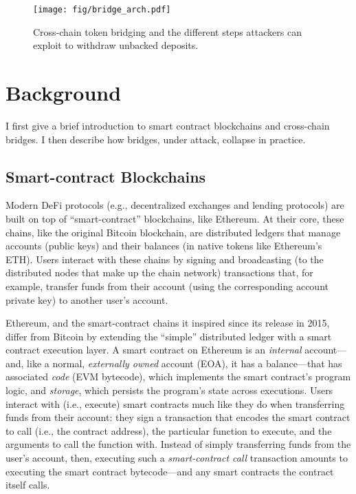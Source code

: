 \begin{figure}[h]
\centering
\texttt{[image: fig/bridge\_arch.pdf]}
\caption[Cross-chain Token Bridging]{Cross-chain token bridging and the different steps attackers can exploit to withdraw unbacked deposits.}
\label{fig:cross-chain}
\end{figure}

\section{Background}
\label{sec:background}
I first give a brief introduction to smart contract blockchains
and cross-chain bridges. I then describe how bridges, under attack, collapse in
practice.

\subsection{Smart-contract Blockchains} Modern DeFi protocols (e.g.,
decentralized exchanges and lending protocols) are built on top
of ``smart-contract'' blockchains, like Ethereum. At their core, these chains, like
the original Bitcoin blockchain, are distributed ledgers that manage accounts
(public keys) and their balances (in native tokens like Ethereum's ETH). Users
interact with these chains by signing and broadcasting (to the distributed nodes
that make up the chain network) transactions that, for example, transfer
funds from their account (using the corresponding account private key) to
another user's account.

Ethereum, and the smart-contract chains it inspired since its release in 2015,
differ from Bitcoin by extending the ``simple'' distributed ledger with a smart
contract execution layer. A smart contract on Ethereum is an \emph{internal}
account---and, like a normal, \emph{externally owned} account (EOA), it has a
balance---that has associated \emph{code} (EVM bytecode), which implements the
smart contract's program logic, and \emph{storage}, which persists the program's
state across executions. Users interact with (i.e., execute) smart contracts
much like they do when transferring funds from their account: they sign a
transaction that encodes the smart contract to call (i.e., the contract address),
the particular function to execute, and the arguments to call the function with.
Instead of simply transferring funds from the user's account, then, executing
such a \emph{smart-contract call} transaction amounts to executing the smart
contract bytecode---and any smart contracts the contract itself calls.
    

